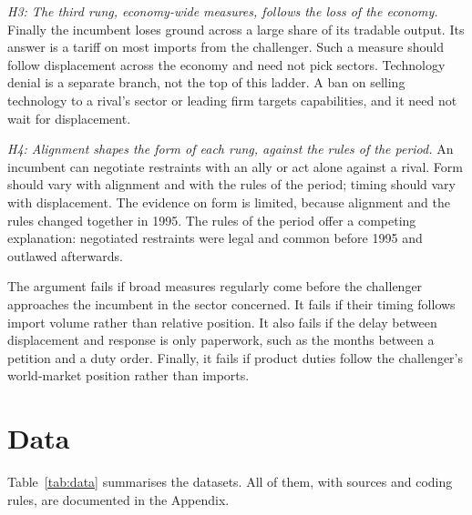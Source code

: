 \documentclass[review,authoryear,12pt]{elsarticle}
\begin{document}
\emph{H3: The third rung, economy-wide measures, follows the loss of the economy.} Finally the incumbent loses ground across a large share of its tradable output. Its answer is a tariff on most imports from the challenger. Such a measure should follow displacement across the economy and need not pick sectors. Technology denial is a separate branch, not the top of this ladder. A ban on selling technology to a rival's sector or leading firm targets capabilities, and it need not wait for displacement.

\emph{H4: Alignment shapes the form of each rung, against the rules of the period.} An incumbent can negotiate restraints with an ally or act alone against a rival. Form should vary with alignment and with the rules of the period; timing should vary with displacement. The evidence on form is limited, because alignment and the rules changed together in 1995. The rules of the period offer a competing explanation: negotiated restraints were legal and common before 1995 and outlawed afterwards.

The argument fails if broad measures regularly come before the challenger approaches the incumbent in the sector concerned. It fails if their timing follows import volume rather than relative position. It also fails if the delay between displacement and response is only paperwork, such as the months between a petition and a duty order. Finally, it fails if product duties follow the challenger's world-market position rather than imports.

\section{Data}\label{sec:data}

Table~\ref{tab:data} summarises the datasets. All of them, with sources and coding rules, are documented in the Appendix.
\end{document}
